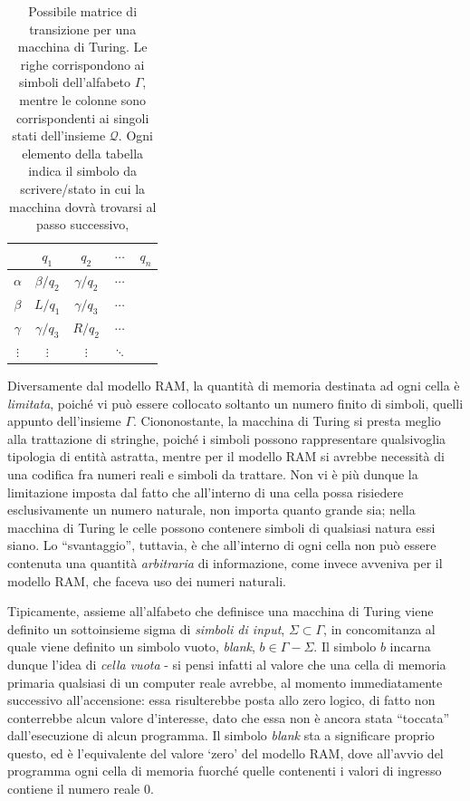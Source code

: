 \documentclass[10pt]{book}
\begin{document}
\begin{table}[ht]
\centering
\begin{tabular}{c|cccc}
    & $q_1$ & $q_2$ & $\cdots$ & $q_n$ \\
    \hline
$\alpha$ & $\beta/q_2$ & $\gamma/q_2$ & $\cdots$ & \\
$\beta$ & $L/q_1$ & $\gamma/q_3$ & $\cdots$ & \\
$\gamma$ & $\gamma/q_3$ & $R/q_2$ & $\cdots$ & \\
$\vdots$ & $\vdots$ & $\vdots$ & $\ddots$ &    
\end{tabular}
\caption{Possibile matrice di transizione per una macchina di Turing. Le righe
corrispondono ai simboli dell'alfabeto $\Gamma$, mentre le colonne sono
corrispondenti ai singoli stati dell'insieme $\mathcal
Q$. Ogni elemento della tabella indica il simbolo da scrivere/stato in cui la
macchina dovrà trovarsi al passo successivo,}\label{tab:matriceTransizione}
\end{table}
\bigskip


Diversamente dal modello RAM, la quantità di memoria destinata ad ogni cella è
\emph{limitata}, poiché vi può essere collocato soltanto un numero finito di
simboli, quelli appunto dell'insieme $\Gamma$. Ciononostante, la macchina di
Turing si presta meglio alla trattazione di stringhe, poiché i simboli possono
rappresentare qualsivoglia tipologia di entità astratta, mentre per il modello
RAM si avrebbe necessità di una codifica fra numeri reali e simboli da
trattare. Non vi è più dunque la limitazione imposta dal fatto che all'interno
di una cella possa risiedere esclusivamente un numero naturale, non importa
quanto grande sia; nella macchina di Turing le celle possono contenere simboli
di qualsiasi natura essi siano. Lo ``svantaggio'', tuttavia, è che all'interno di
ogni cella non può essere contenuta una quantità \emph{arbitraria} di
informazione, come invece avveniva per il modello RAM, che faceva uso dei
numeri naturali.

Tipicamente, assieme all'alfabeto che definisce una macchina di Turing viene definito
un sottoinsieme sigma di \emph{simboli di input}, $\Sigma \subset \Gamma$, in
concomitanza al quale viene definito un simbolo vuoto, \emph{blank}, $b \in
\Gamma - \Sigma$. Il simbolo $b$ incarna dunque l'idea di \emph{cella
vuota} \-- si pensi infatti al valore che una cella di memoria primaria
qualsiasi di un computer reale avrebbe, al momento immediatamente successivo
all'accensione: essa risulterebbe posta allo zero logico, di fatto non
conterrebbe alcun valore d'interesse, dato che essa non è ancora stata
``toccata'' dall'esecuzione di alcun programma. Il simbolo \emph{blank} sta a
significare proprio questo, ed è l'equivalente del valore `zero' del modello
RAM, dove all'avvio del programma ogni cella di memoria fuorché quelle
contenenti i valori di ingresso contiene il numero reale $0$. 
\end{document}
